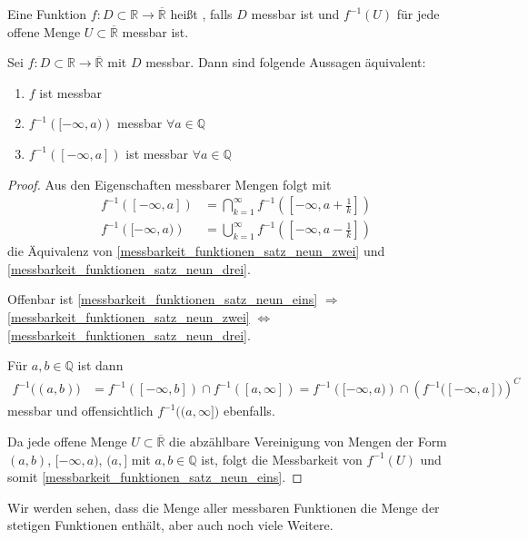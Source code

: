 \begin{*definition}
	Eine Funktion $f:D\subset\mathbb{R}\to\overline{\mathbb{R}}$ heißt , falls $D$ messbar ist und $f^{-1}(U)$ für jede offene Menge $U\subset\overline{\mathbb{R}}$ messbar ist.
\end{*definition}

\begin{conclusion}
	Sei $f:D\subset\mathbb{R}\to\overline{\mathbb{R}}$ mit $D$ messbar. Dann sind folgende Aussagen äquivalent:\begin{enumerate}[label={(\alph*)}]
		\item {}
		$f$ ist messbar
		\item {}
		$f^{-1}\left( [-\infty, a)\right)$ messbar $\forall a\in\mathbb{Q}$
		\item {}
		$f^{-1}\left( [-\infty, a] \right)$ ist messbar $\forall a\in \mathbb{Q}$
	\end{enumerate}
\end{conclusion}

\begin{proof}
	Aus den Eigenschaften messbarer Mengen folgt mit \begin{align*}
		f^{-1}\left( [-\infty, a]\right) &= \bigcap_{k=1}^\infty f^{-1}\left( \left[ -\infty, a + \frac{1}{k} \right]\right) \\
		f^{-1} \left([-\infty, a)\right) &= \bigcup_{k=1}^\infty f^{-1}\left( \left[ -\infty, a - \frac{1}{k}\right] \right)
	\end{align*}
	die Äquivalenz von \ref{messbarkeit_funktionen_satz_neun_zwei} und \ref{messbarkeit_funktionen_satz_neun_drei}.
	
	Offenbar ist \ref{messbarkeit_funktionen_satz_neun_eins} $\Rightarrow$ \ref{messbarkeit_funktionen_satz_neun_zwei} $\Leftrightarrow$ \ref{messbarkeit_funktionen_satz_neun_drei}.
	
	Für $a,b\in\mathbb{Q}$ ist dann \begin{align*}
		f^{-1}\big( (a,b) \big) &= f^{-1}\left( [-\infty, b]\right) \cap f^{-1}\left( [a,\infty] \right) = f^{-1}\left( [-\infty, a)\right) \cap \left( f^{-1} \big( [-\infty, a] \big)\right)^C
	\end{align*}
	messbar und offensichtlich $f^{-1}\big( (a,\infty] \big)$ ebenfalls.
	
	Da jede offene Menge $U\subset\overline{\mathbb{R}}$ die abzählbare Vereinigung von Mengen der Form $(a,b)$, $[-\infty, a)$, $(a,]$ mit $a,b\in\mathbb{Q}$ ist, folgt die Messbarkeit von $f^{-1}(U)$ und somit \ref{messbarkeit_funktionen_satz_neun_eins}.
\end{proof}
\begin{underlinedenvironment}[Hinweis]
	Wir werden sehen, dass die Menge aller messbaren Funktionen die Menge der stetigen Funktionen enthält, aber auch noch viele Weitere.
\end{underlinedenvironment}

